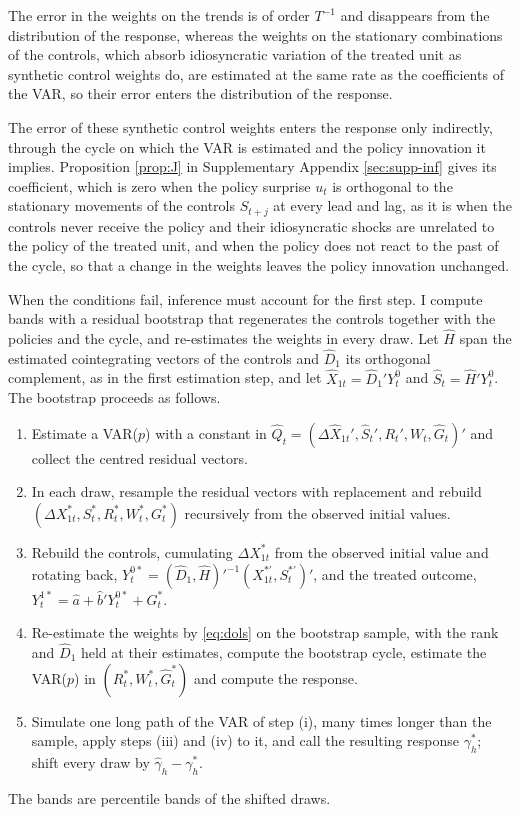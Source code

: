 \documentclass[12pt,a4paper]{article}
\theoremstyle{definition}
\theoremstyle{definition}\newtheorem{example}{Example}
\theoremstyle{definition}\newtheorem{definition}{Definition}
\begin{document}
The error in the weights on the trends is of order $T^{-1}$ and disappears from the distribution of the response, whereas the weights on the stationary combinations of the controls, which absorb idiosyncratic variation of the treated unit as synthetic control weights do, are estimated at the same rate as the coefficients of the VAR, so their error enters the distribution of the response.

The error of these synthetic control weights enters the response only indirectly, through the cycle on which the VAR is estimated and the policy innovation it implies. Proposition \ref{prop:J} in Supplementary Appendix \ref{sec:supp-inf} gives its coefficient, which is zero when the policy surprise $u_t$ is orthogonal to the stationary movements of the controls $S_{t+j}$ at every lead and lag, as it is when the controls never receive the policy and their idiosyncratic shocks are unrelated to the policy of the treated unit, and when the policy does not react to the past of the cycle, so that a change in the weights leaves the policy innovation unchanged.

When the conditions fail, inference must account for the first step. I compute bands with a residual bootstrap that regenerates the controls together with the policies and the cycle, and re-estimates the weights in every draw. Let $\hat H$ span the estimated cointegrating vectors of the controls and $\hat D_1$ its orthogonal complement, as in the first estimation step, and let $\hat X_{1t}=\hat D_1'Y^0_t$ and $\hat S_t=\hat H'Y^0_t$. The bootstrap proceeds as follows.
\begin{enumerate}
\item[(i)] Estimate a VAR($p$) with a constant in $\hat Q_t=(\Delta\hat X_{1t}',\hat S_t',R_t',W_t,\hat G_t)'$ and collect the centred residual vectors.
\item[(ii)] In each draw, resample the residual vectors with replacement and rebuild $(\Delta X^\ast_{1t},S^\ast_t,R^\ast_t,W^\ast_t,G^\ast_t)$ recursively from the observed initial values.
\item[(iii)] Rebuild the controls, cumulating $\Delta X^\ast_{1t}$ from the observed initial value and rotating back, $Y^{0\ast}_t=(\hat D_1,\hat H)'^{-1}(X^{\ast\prime}_{1t},S^{\ast\prime}_t)'$, and the treated outcome, $Y^{1\ast}_t=\hat a+\hat b'Y^{0\ast}_t+G^\ast_t$.
\item[(iv)] Re-estimate the weights by \eqref{eq:dols} on the bootstrap sample, with the rank and $\hat D_1$ held at their estimates, compute the bootstrap cycle, estimate the VAR($p$) in $(R^\ast_t,W^\ast_t,\hat G^\ast_t)$ and compute the response.
\item[(v)] Simulate one long path of the VAR of step (i), many times longer than the sample, apply steps (iii) and (iv) to it, and call the resulting response $\gamma^\ast_h$; shift every draw by $\hat\gamma_h-\gamma^\ast_h$.
\end{enumerate}
The bands are percentile bands of the shifted draws.
\end{document}
